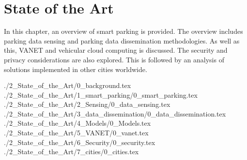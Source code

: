 \chapter{State of the Art}
In this chapter, an overview of smart parking is provided. The overview includes parking data sensing and parking data dissemination methodologies. As well as this, \ac{VANET} and vehicular cloud computing is discussed. The security and privacy considerations are also explored. This is followed by an analysis of solutions implemented in other cities worldwide.

{./2_State_of_the_Art/0_background.tex}
{./2_State_of_the_Art/1_smart_parking/0_smart_parking.tex}
{./2_State_of_the_Art/2_Sensing/0_data_sensing.tex}
{./2_State_of_the_Art/3_data_dissemination/0_data_dissemination.tex}
{./2_State_of_the_Art/4_Models/0_Models.tex}
{./2_State_of_the_Art/5_VANET/0_vanet.tex}
{./2_State_of_the_Art/6_Security/0_security.tex}
{./2_State_of_the_Art/7_cities/0_cities.tex}




